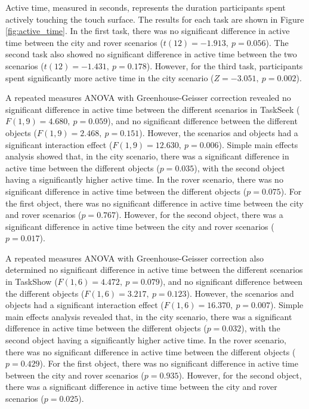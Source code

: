             Active time, measured in seconds, represents the duration participants spent actively touching the touch surface. The results for each task are shown in Figure \ref{fig:active_time}. In the first task, there was no significant difference in active time between the city and rover scenarios ($t(12) = -1.913,\ p = 0.056$). The second task also showed no significant difference in active time between the two scenarios ($t(12) = -1.431,\ p = 0.178$). However, for the third task, participants spent significantly more active time in the city scenario ($Z = -3.051,\ p=0.002$).

            A repeated measures ANOVA with Greenhouse-Geisser correction revealed no significant difference in active time between the different scenarios in TaskSeek ($F(1, 9) = 4.680,\ p = 0.059$), and no significant difference between the different objects ($F(1, 9) = 2.468,\ p = 0.151$). However, the scenarios and objects had a significant interaction effect ($F(1, 9) = 12.630,\ p = 0.006$). Simple main effects analysis showed that, in the city scenario, there was a significant difference in active time between the different objects ($p=0.035$), with the second object having a significantly higher active time. In the rover scenario, there was no significant difference in active time between the different objects ($p=0.075$). For the first object, there was no significant difference in active time between the city and rover scenarios ($p=0.767$). However, for the second object, there was a significant difference in active time between the city and rover scenarios ($p=0.017$).

            A repeated measures ANOVA with Greenhouse-Geisser correction also determined no significant difference in active time between the different scenarios in TaskShow ($F(1, 6) = 4.472,\ p = 0.079$), and no significant difference between the different objects ($F(1, 6) = 3.217,\ p = 0.123$). However, the scenarios and objects had a significant interaction effect ($F(1, 6) = 16.370,\ p = 0.007$). Simple main effects analysis revealed that, in the city scenario, there was a significant difference in active time between the different objects ($p=0.032$), with the second object having a significantly higher active time. In the rover scenario, there was no significant difference in active time between the different objects ($p=0.429$). For the first object, there was no significant difference in active time between the city and rover scenarios ($p=0.935$). However, for the second object, there was a significant difference in active time between the city and rover scenarios ($p=0.025$).

